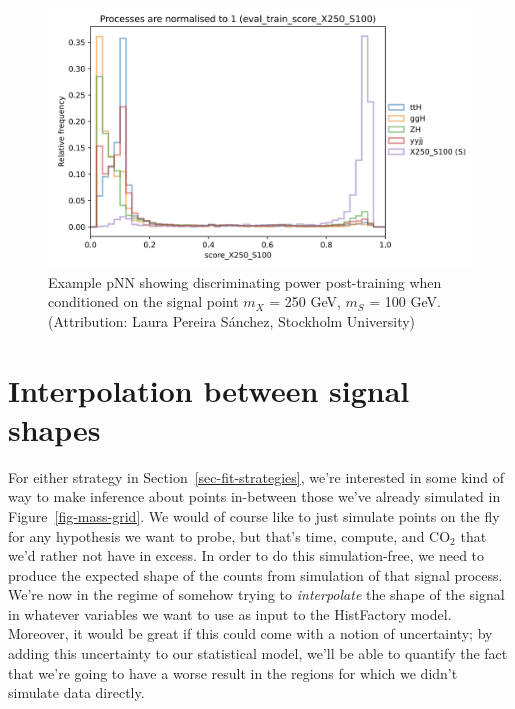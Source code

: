 \documentclass[
  11pt,
  numbers=noendperiod]{book}
\begin{document}
\begin{figure}

{\centering \includegraphics{./images/sh/laura-pnn.png}

}

\caption{\label{fig-laura}Example pNN showing discriminating power
post-training when conditioned on the signal point \(m_X\) = 250 GeV,
\(m_S\) = 100 GeV. (Attribution: Laura Pereira Sánchez, Stockholm
University)}

\end{figure}

\hypertarget{sec-sh-flows}{%
\section{Interpolation between signal shapes}\label{sec-sh-flows}}

For either strategy in Section~\ref{sec-fit-strategies}, we're
interested in some kind of way to make inference about points in-between
those we've already simulated in Figure~\ref{fig-mass-grid}. We would of
course like to just simulate points on the fly for any hypothesis we
want to probe, but that's time, compute, and CO\(_2\) that we'd rather
not have in excess. In order to do this simulation-free, we need to
produce the expected shape of the counts from simulation of that signal
process. We're now in the regime of somehow trying to \emph{interpolate}
the shape of the signal in whatever variables we want to use as input to
the HistFactory model. Moreover, it would be great if this could come
with a notion of uncertainty; by adding this uncertainty to our
statistical model, we'll be able to quantify the fact that we're going
to have a worse result in the regions for which we didn't simulate data
directly.
\end{document}

